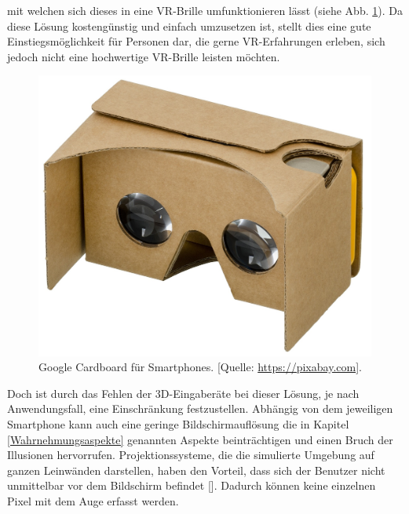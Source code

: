 \documentclass[a4paper,12pt,oneside]{article}
\begin{document}
        mit welchen sich dieses in eine VR-Brille umfunktionieren lässt (siehe Abb. \ref{fig:google-cardboard}).
        Da diese Lösung kostengünstig und einfach umzusetzen ist, stellt dies eine
        gute Einstiegsmöglichkeit für Personen dar, die gerne
        VR-Erfahrungen erleben, sich jedoch nicht eine hochwertige VR-Brille leisten
        möchten.
        \begin{figure}[t]
          \centering
          \includegraphics[scale=0.7]{img/google-cardboard.jpg}
          \caption[Google Cardboard für Smartphones.]{Google Cardboard für Smartphones. [Quelle: \url{https://pixabay.com}].}
          \label{fig:google-cardboard}
        \end{figure}
        Doch ist durch das Fehlen der 3D-Eingaberäte bei dieser Lösung, je
        nach Anwendungsfall, eine Einschränkung festzustellen. Abhängig von dem 
        jeweiligen Smartphone kann 
        auch eine geringe
        Bildschirmauflösung die in Kapitel \ref{Wahrnehmungsaspekte} genannten Aspekte
        beinträchtigen und einen Bruch der Illusionen hervorrufen.
        Projektionssysteme, die die simulierte Umgebung auf ganzen Leinwänden darstellen,
        haben den Vorteil, dass sich der Benutzer nicht unmittelbar vor dem Bildschirm
        befindet [\cite[134]{Dorner2013}]. Dadurch können keine einzelnen Pixel mit dem Auge 
        erfasst werden. \\ \\ \\ \\
\end{document}
